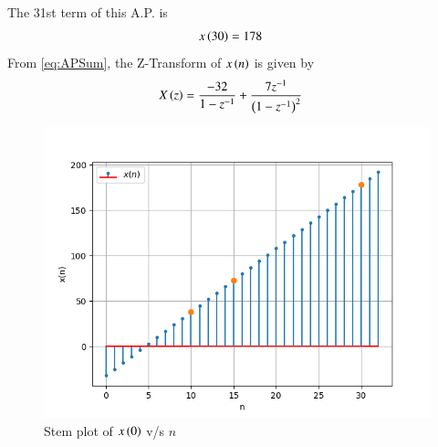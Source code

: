 \documentclass[journal,12pt,twocolumn]{IEEEtran}
\theoremstyle{remark}
\begin{document}
The 31st term of this A.P. is 
\begin{align}x\left(30\right)&=178\end{align}
 From \eqref{eq:APSum}, the Z-Transform of $x\left(n\right)$ is given by 
\begin{align}
    X\left(z\right)&=\frac{-32}{1-z^{-1}}+\frac{7z^{-1}}{\left(1-z^{-1}\right)^2}
\end{align}
 \begin{figure}[h]
    \centering
    \includegraphics[width=\columnwidth]{figs/fig1.png}
    \caption{Stem plot of $x\left(0\right)$ v/s $n$}
 \end{figure}
\end{document}
